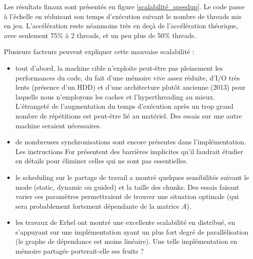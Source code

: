 \documentclass[11pt,a4paper,oneside]{memoir}
\theoremstyle{definition}
\theoremstyle{remark}
\theoremstyle{plain}
\begin{document}
Les résultats finaux sont présentés en figure \ref{scalabilité_speedup}. Le code passe à l'échelle en réduisant son temps d'exécution suivant le nombre de threads mis en jeu. L'accélération reste néanmoins très en deçà de l'accélération théorique, avec seulement 75\% à 2 threads, et un peu plus de 50\% threads.\medskip

Plusieurs facteurs peuvent expliquer cette mauvaise scalabilité :
\begin{itemize}
\item tout d'abord, la machine cible n'exploite peut-être pas pleinement les performances du code, du fait d'une mémoire vive assez réduite, d'I/O très lents (présence d'un HDD) et d'une architecture plutôt ancienne (2013) pour laquelle nous n'employons les caches et l'hyperthreading au mieux. L'étrangeté de l'augmentation du temps d'exécution après un trop grand nombre de répétitions est peut-être lié au matériel. Des essais sur une autre machine seraient nécessaires.
\item de nombreuses synchronisations sont encore présentes dans l'implémentation. Les instructions For présentent des barrières implicites qu'il faudrait étudier en détails pour éliminer celles qui ne sont pas essentielles.
\item le scheduling sur le partage de travail a montré quelques sensibilités suivant le mode (static, dynamic ou guided) et la taille des chunks. Des essais faisant varier ces paramètres permettraient de trouver une situation optimale (qui sera probablement fortement dépendante de la matrice $A$).
\item les travaux de Erhel \cite{erhel95} ont montré une excellente scalabilité en distribué, en s'appuyant sur une implémentation ayant un plus fort degré de parallélisation (le graphe de dépendance est moins linéaire). Une telle implémentation en mémoire partagée porterait-elle ses fruits ?
\end{itemize}
\end{document}
